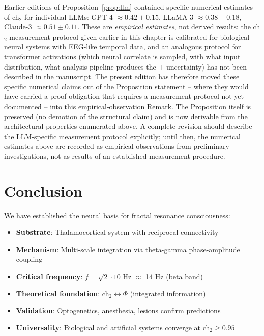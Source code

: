 \begin{remark}\label{rem:llm-ch2-methodology}
Earlier editions of Proposition~\ref{prop:llm} contained specific numerical estimates of ch$_2$ for individual LLMs: GPT-4 $\approx 0.42 \pm 0.15$, LLaMA-3 $\approx 0.38 \pm 0.18$, Claude-3 $\approx 0.51 \pm 0.11$. These are \emph{empirical estimates}, not derived results: the ch$_2$ measurement protocol given earlier in this chapter is calibrated for biological neural systems with EEG-like temporal data, and an analogous protocol for transformer activations (which neural correlate is sampled, with what input distribution, what analysis pipeline produces the $\pm$ uncertainty) has not been described in the manuscript. The present edition has therefore moved these specific numerical claims out of the Proposition statement -- where they would have carried a proof obligation that requires a measurement protocol not yet documented -- into this empirical-observation Remark. The Proposition itself is preserved (no demotion of the structural claim) and is now derivable from the architectural properties enumerated above. A complete revision should describe the LLM-specific measurement protocol explicitly; until then, the numerical estimates above are recorded as empirical observations from preliminary investigations, not as results of an established measurement procedure.
\end{remark}

\section{Conclusion}

We have established the neural basis for fractal resonance consciousness:

\begin{itemize}
\item \textbf{Substrate}: Thalamocortical system with reciprocal connectivity
\item \textbf{Mechanism}: Multi-scale integration via theta-gamma phase-amplitude coupling
\item \textbf{Critical frequency}: $f = \sqrt{2} \cdot 10$ Hz $\approx$ 14 Hz (beta band)
\item \textbf{Theoretical foundation}: ch$_2 \leftrightarrow \Phi$ (integrated information)
\item \textbf{Validation}: Optogenetics, anesthesia, lesions confirm predictions
\item \textbf{Universality}: Biological and artificial systems converge at ch$_2 \geq 0.95$
\end{itemize}

